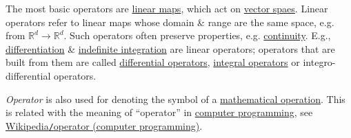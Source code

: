 \documentclass{article}
\begin{document}
The most basic operators are \href{https://en.wikipedia.org/wiki/Linear_map}{linear maps}, which act on \href{https://en.wikipedia.org/wiki/Vector_space}{vector spaes}. Linear operators refer to linear maps whose domain \& range are the same space, e.g. from $\mathbb{R}^d\to\mathbb{R}^d$. Such operators often preserve properties, e.g. \href{https://en.wikipedia.org/wiki/Continuous_function}{continuity}. E.g., \href{https://en.wikipedia.org/wiki/Differentiation_(mathematics)}{differentiation} \& \href{https://en.wikipedia.org/wiki/Indefinite_integration}{indefinite integration} are linear operators; operators that are built from them are called \href{https://en.wikipedia.org/wiki/Differential_operator}{differential operators}, \href{https://en.wikipedia.org/wiki/Integral_operator}{integral operators} or integro-differential operators.

{\it Operator} is also used for denoting the symbol of a \href{https://en.wikipedia.org/wiki/Mathematical_operation}{mathematical operation}. This is related with the meaning of ``operator'' in \href{https://en.wikipedia.org/wiki/Computer_programming}{computer programming}, see \href{https://en.wikipedia.org/wiki/Operator_(computer_programming)}{Wikipedia{\tt/}operator (computer programming)}.
	
\end{document}
